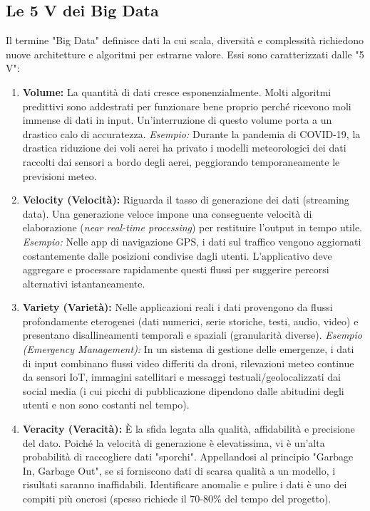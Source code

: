 \subsection{Le 5 V dei Big Data}
Il termine "Big Data" definisce dati la cui scala, diversità e complessità richiedono nuove architetture e algoritmi per estrarne valore. Essi sono caratterizzati dalle "5 V":

\begin{enumerate}
    \item \textbf{Volume:} La quantità di dati cresce esponenzialmente. Molti algoritmi predittivi sono addestrati per funzionare bene proprio perché ricevono moli immense di dati in input. Un'interruzione di questo volume porta a un drastico calo di accuratezza. 
    \textit{Esempio:} Durante la pandemia di COVID-19, la drastica riduzione dei voli aerei ha privato i modelli meteorologici dei dati raccolti dai sensori a bordo degli aerei, peggiorando temporaneamente le previsioni meteo.
    
    \item \textbf{Velocity (Velocità):} Riguarda il tasso di generazione dei dati (streaming data). Una generazione veloce impone una conseguente velocità di elaborazione (\textit{near real-time processing}) per restituire l'output in tempo utile.
    \textit{Esempio:} Nelle app di navigazione GPS, i dati sul traffico vengono aggiornati costantemente dalle posizioni condivise dagli utenti. L'applicativo deve aggregare e processare rapidamente questi flussi per suggerire percorsi alternativi istantaneamente.
    
    \item \textbf{Variety (Varietà):} Nelle applicazioni reali i dati provengono da flussi profondamente eterogenei (dati numerici, serie storiche, testi, audio, video) e presentano disallineamenti temporali e spaziali (granularità diverse).
    \textit{Esempio (Emergency Management):} In un sistema di gestione delle emergenze, i dati di input combinano flussi video differiti da droni, rilevazioni meteo continue da sensori IoT, immagini satellitari e messaggi testuali/geolocalizzati dai social media (i cui picchi di pubblicazione dipendono dalle abitudini degli utenti e non sono costanti nel tempo).
    
    \item \textbf{Veracity (Veracità):} È la sfida legata alla qualità, affidabilità e precisione del dato. Poiché la velocità di generazione è elevatissima, vi è un'alta probabilità di raccogliere dati "sporchi". Appellandosi al principio "Garbage In, Garbage Out", se si forniscono dati di scarsa qualità a un modello, i risultati saranno inaffidabili. Identificare anomalie e pulire i dati è uno dei compiti più onerosi (spesso richiede il 70-80\% del tempo del progetto).
    

\end{enumerate}
